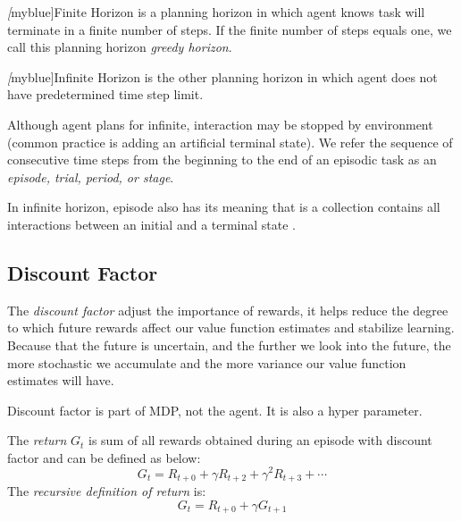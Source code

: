     \emph[myblue]{Finite Horizon} is a planning horizon in which agent knows task will terminate in a finite number of steps. If the finite number of steps equals one, we call this planning horizon {\itshape greedy horizon}.\par
    \emph[myblue]{Infinite Horizon} is the other planning horizon in which agent does not have predetermined time step limit.\par
    Although agent plans for infinite, interaction may be stopped by environment (common practice is adding an artificial terminal state).
    We refer the sequence of consecutive time steps from the beginning to the end of an episodic task as an \emph{episode, trial, period, or stage}.\par 
    In infinite horizon, episode also has its meaning that is a collection contains all interactions between an initial and a terminal state .

    \subsection{Discount Factor}
    The \emph{discount factor} adjust the importance of rewards, it helps reduce the degree to which future rewards affect our value function estimates and stabilize learning. Because that the future is uncertain, and the further we look into the future, the more stochastic we accumulate and the more variance our value function estimates will have. \par

    Discount factor is part of MDP, not the agent. It is also a hyper parameter.
    

    The \emph{return} $G_t$ is sum of all rewards obtained during an episode with discount factor and can be defined as below:
    \begin{equation}
    G_t=R_{t+0}+ \gamma R_{t+2} + \gamma^2 R_{t+3} + \cdots
    \end{equation}
    The \emph{recursive definition of return} is:
    \begin{equation}
    G_t = R_{t+0}+\gamma G_{t+1}
    \end{equation}